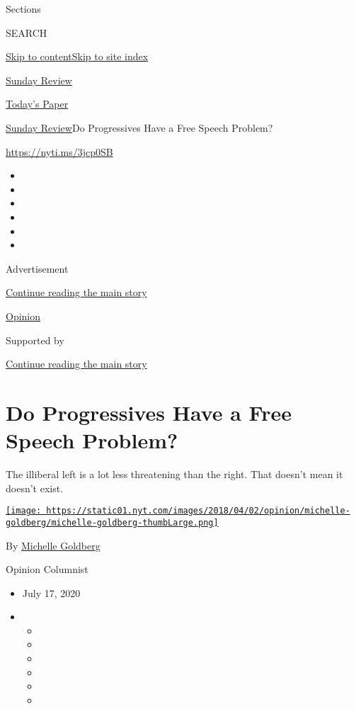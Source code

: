 Sections

SEARCH

\protect\hyperlink{site-content}{Skip to
content}\protect\hyperlink{site-index}{Skip to site index}

\href{https://www.nytimes.com/section/opinion/sunday}{Sunday Review}

\href{https://myaccount.nytimes.com/auth/login?response_type=cookie\&client_id=vi}{}

\href{https://www.nytimes.com/section/todayspaper}{Today's Paper}

\href{/section/opinion/sunday}{Sunday Review}\textbar{}Do Progressives
Have a Free Speech Problem?

\href{https://nyti.ms/3jcp0SB}{https://nyti.ms/3jcp0SB}

\begin{itemize}
\item
\item
\item
\item
\item
\item
\end{itemize}

Advertisement

\protect\hyperlink{after-top}{Continue reading the main story}

\href{/section/opinion}{Opinion}

Supported by

\protect\hyperlink{after-sponsor}{Continue reading the main story}

\hypertarget{do-progressives-have-a-free-speech-problem}{%
\section{Do Progressives Have a Free Speech
Problem?}\label{do-progressives-have-a-free-speech-problem}}

The illiberal left is a lot less threatening than the right. That
doesn't mean it doesn't exist.

\href{https://www.nytimes.com/by/michelle-goldberg}{\texttt{[image: https://static01.nyt.com/images/2018/04/02/opinion/michelle-goldberg/michelle-goldberg-thumbLarge.png]}}

By \href{https://www.nytimes.com/by/michelle-goldberg}{Michelle
Goldberg}

Opinion Columnist

\begin{itemize}
\item
  July 17, 2020
\item
  \begin{itemize}
  \item
  \item
  \item
  \item
  \item
  \item
  \end{itemize}
\end{itemize}

